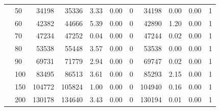 \documentclass[12pt]{article}
\begin{document}
\begin{table}
{\begin{tabular}{llr|rrrr|rrrr}
   & 50  &    34198 &    35336 &   3.33 &   0.00 &          0 &    34198 &  0.00 &   0.00 &          1 \\
   & 60  &    42382 &    44666 &   5.39 &   0.00 &          0 &    42890 &  1.20 &   0.00 &          1 \\
   & 70  &    47234 &    47252 &   0.04 &   0.00 &          0 &    47244 &  0.02 &   0.00 &          1 \\
   & 80  &    53538 &    55448 &   3.57 &   0.00 &          0 &    53538 &  0.00 &   0.00 &          1 \\
   & 90  &    69731 &    71779 &   2.94 &   0.00 &          0 &    69747 &  0.02 &   0.00 &          1 \\
   & 100 &    83495 &    86513 &   3.61 &   0.00 &          0 &    85293 &  2.15 &   0.00 &          1 \\
   & 150 &   104772 &   105824 &   1.00 &   0.00 &          0 &   104940 &  0.16 &   0.00 &          1 \\
   & 200 &   130178 &   134640 &   3.43 &   0.00 &          0 &   130194 &  0.01 &   0.00 &          1 \\

\bottomrule
\end{tabular}%
}
\end{table}
\end{document}
